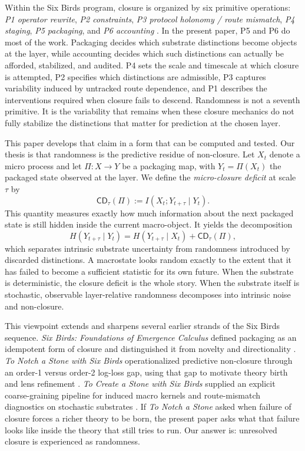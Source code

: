 \documentclass[11pt]{article}
\numberwithin{equation}{section}
\begin{document}
Within the Six Birds program, closure is organized by six primitive operations: \emph{P1 operator rewrite}, \emph{P2 constraints}, \emph{P3 protocol holonomy / route mismatch}, \emph{P4 staging}, \emph{P5 packaging}, and \emph{P6 accounting} \citep{tsiokos2026sixbirds}. In the present paper, P5 and P6 do most of the work. Packaging decides which substrate distinctions become objects at the layer, while accounting decides which such distinctions can actually be afforded, stabilized, and audited. P4 sets the scale and timescale at which closure is attempted, P2 specifies which distinctions are admissible, P3 captures variability induced by untracked route dependence, and P1 describes the interventions required when closure fails to descend. Randomness is not a seventh primitive. It is the variability that remains when these closure mechanics do not fully stabilize the distinctions that matter for prediction at the chosen layer.

This paper develops that claim in a form that can be computed and tested. Our thesis is that randomness is the predictive residue of non-closure. Let $X_t$ denote a micro process and let $\Pi : X \to Y$ be a packaging map, with $Y_t = \Pi(X_t)$ the packaged state observed at the layer. We define the \emph{micro-closure deficit} at scale $\tau$ by
\[
\mathsf{CD}_\tau(\Pi) := I(X_t; Y_{t+\tau} \mid Y_t).
\]
This quantity measures exactly how much information about the next packaged state is still hidden inside the current macro-object. It yields the decomposition
\[
H(Y_{t+\tau}\mid Y_t)
=
H(Y_{t+\tau}\mid X_t)
+
\mathsf{CD}_\tau(\Pi),
\]
which separates intrinsic substrate uncertainty from randomness introduced by discarded distinctions. A macrostate looks random exactly to the extent that it has failed to become a sufficient statistic for its own future. When the substrate is deterministic, the closure deficit is the whole story. When the substrate itself is stochastic, observable layer-relative randomness decomposes into intrinsic noise and non-closure.

This viewpoint extends and sharpens several earlier strands of the Six Birds sequence. \emph{Six Birds: Foundations of Emergence Calculus} defined packaging as an idempotent form of closure and distinguished it from novelty and directionality \citep{tsiokos2026sixbirds}. \emph{To Notch a Stone with Six Birds} operationalized predictive non-closure through an order-1 versus order-2 log-loss gap, using that gap to motivate theory birth and lens refinement \citep{tsiokos2026notch}. \emph{To Create a Stone with Six Birds} supplied an explicit coarse-graining pipeline for induced macro kernels and route-mismatch diagnostics on stochastic substrates \citep{tsiokos2026pica}. If \emph{To Notch a Stone} asked when failure of closure forces a richer theory to be born, the present paper asks what that failure looks like inside the theory that still tries to run. Our answer is: unresolved closure is experienced as randomness.
\end{document}
